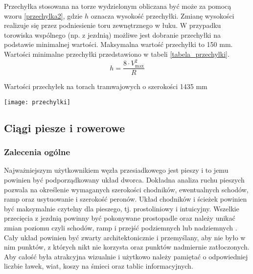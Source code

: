 \documentclass[twoside,12pt]{article}
\begin{document}
	Przechyłka stosowana na torze wydzielonym obliczana być może za pomocą wzoru \ref{przechylka2}, gdzie $h$ oznacza wysokość przechyłki. Zmianę wysokości realizuje się przez podniesienie toru zewnętrznego w łuku. W przypadku torowiska wspólnego (np. z jezdnią) możliwe jest dobranie przechyłki na podstawie minimalnej wartości. Maksymalna wartość przechyłki to 150 mm. Wartości minimalne przechyłki przedstawiono w tabeli \ref{tabela_przechylki}.
	\begin{equation}\label{przechylka2}
	h = \frac{8\cdot V_{\max}^2}{R}
	\end{equation}	 
	
		\begin{table}[H]
		\centering
		\caption{Wartości przechyłek na torach tramwajowych o szerokości 1435 mm}
		\texttt{[image: przechylki]}\\
		\label{tabela_przechylki}
	\end{table}	
	
	
	
	
	
	\clearpage
	\subsection{Ciągi piesze i rowerowe} \label{sec:ciagi_piesze}
	
	\subsubsection{Zalecenia ogólne}
	
	Najważniejszym użytkownikiem węzła przesiadkowego jest pieszy i to jemu powinien być podporządkowany układ dworca. Dokładna analiza ruchu pieszych pozwala na określenie wymaganych szerokości chodników, ewentualnych schodów, ramp oraz usytuowanie i szerokość peronów. Układ chodników i ścieżek powinien być maksymalnie czytelny dla pieszego, tj. prostoliniowy i intuicyjny. Wszelkie przecięcia z jezdnią powinny być pokonywane prostopadle oraz należy unikać zmian poziomu czyli schodów, ramp i przejść podziemnych lub nadziemnych  \cite{zaluski}. Cały układ powinien być zwarty architektonicznie i przemyślany, aby nie było w nim punktów, z których nikt nie korzysta oraz punktów nadmiernie zatłoczonych. Aby całość była atrakcyjna wizualnie i użytkowo należy pamiętać o odpowiedniej liczbie ławek, wiat, koszy na śmieci oraz tablic informacyjnych. 
	
\end{document}
